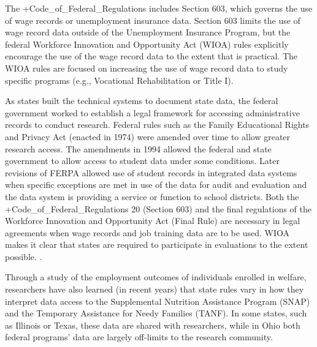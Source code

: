 \documentclass[
]{WileySix}
\begin{document}
The +Code\_of\_Federal\_Regulations\textbar{} includes Section 603, which governs the use of wage records or unemployment insurance data. Section 603 limits the use of wage record data outside of the Unemployment Insurance Program, but the federal Workforce Innovation and Opportunity Act (WIOA) rules explicitly encourage the use of the wage record data to the extent that is practical. The WIOA rules are focused on increasing the use of wage record data to study specific programs (e.g., Vocational Rehabilitation or Title I).

As states built the technical systems to document state data, the federal government worked to establish a legal framework for accessing administrative records to conduct research. Federal rules such as the Family Educational Rights and Privacy Act (enacted in 1974) were amended over time to allow greater research access. The amendments in 1994 allowed the federal and state government to allow access to student data under some conditions. Later revisions of FERPA allowed use of student records in integrated data systems when specific exceptions are met in use of the data for audit and evaluation and the data system is providing a service or function to school districts. Both the +Code\_of\_Federal\_Regulations\textbar{} 20 (Section 603) and the final regulations of the Workforce Innovation and Opportunity Act (Final Rule) are necessary in legal agreements when wage records and job training data are to be used. WIOA makes it clear that states are required to participate in evaluations to the extent possible. \citep{officeofthefederalregister2016a}.

Through a study of the employment outcomes of individuals enrolled in welfare, researchers have also learned (in recent years) that state rules vary in how they interpret data access to the Supplemental Nutrition Assistance Program (SNAP) and the Temporary Assistance for Needy Families (TANF). In some states, such as Illinois or Texas, these data are shared with researchers, while in Ohio both federal programs' data are largely off-limits to the research community.
\end{document}

